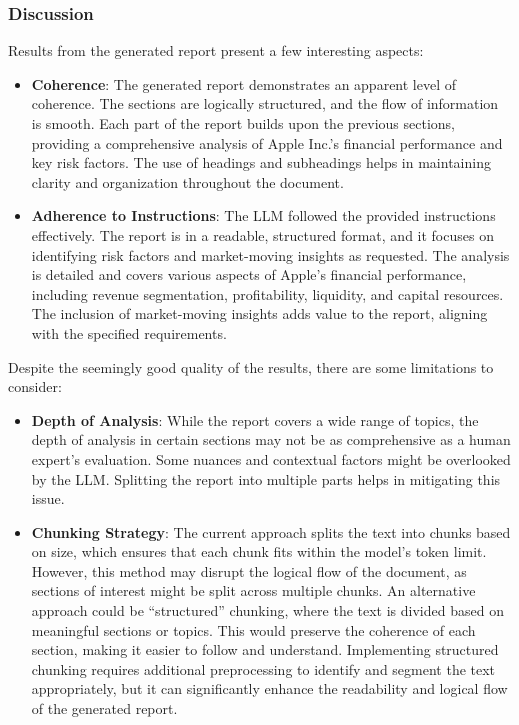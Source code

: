 \subsubsection{Discussion}

Results from the generated report present a few interesting aspects:

\begin{itemize}
\item \textbf{Coherence}: The generated report demonstrates an apparent level of coherence. The sections are logically structured, and the flow of information is smooth. Each part of the report builds upon the previous sections, providing a comprehensive analysis of Apple Inc.'s financial performance and key risk factors. The use of headings and subheadings helps in maintaining clarity and organization throughout the document.

\item \textbf{Adherence to Instructions}: The LLM followed the provided instructions effectively. The report is in a readable, structured format, and it focuses on identifying risk factors and market-moving insights as requested. The analysis is detailed and covers various aspects of Apple's financial performance, including revenue segmentation, profitability, liquidity, and capital resources. The inclusion of market-moving insights adds value to the report, aligning with the specified requirements.
\end{itemize}

Despite the seemingly good quality of the results, there are some limitations to consider:

\begin{itemize}
\item \textbf{Depth of Analysis}: While the report covers a wide range of topics, the depth of analysis in certain sections may not be as comprehensive as a human expert's evaluation. Some nuances and contextual factors might be overlooked by the LLM. Splitting the report into multiple parts helps in mitigating this issue.

\item \textbf{Chunking Strategy}: The current approach splits the text into chunks based on size, which ensures that each chunk fits within the model's token limit. However, this method may disrupt the logical flow of the document, as sections of interest might be split across multiple chunks. An alternative approach could be ``structured'' chunking, where the text is divided based on meaningful sections or topics. This would preserve the coherence of each section, making it easier to follow and understand. Implementing structured chunking requires additional preprocessing to identify and segment the text appropriately, but it can significantly enhance the readability and logical flow of the generated report.
\end{itemize}

